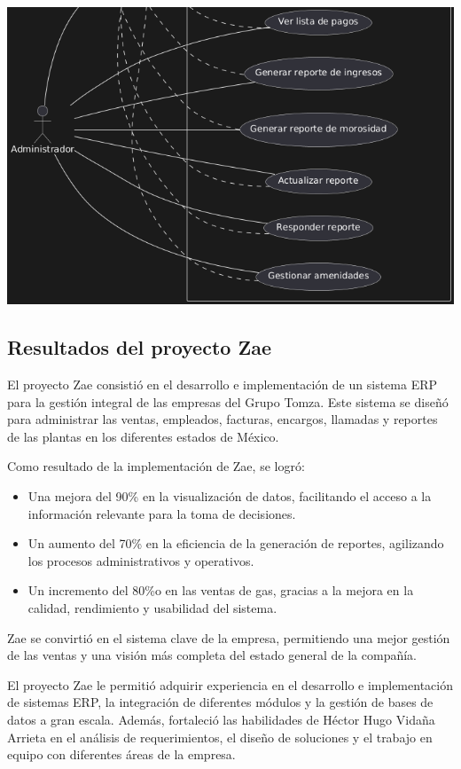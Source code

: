 \documentclass[protocolo.tex]{subfiles}
\begin{document}
\includegraphics[scale=0.8]{Imagenes/adminfracpt4.png}


\subsection{Resultados del proyecto Zae}

El proyecto Zae consistió en el desarrollo e implementación de un sistema ERP para la gestión integral de las empresas del Grupo Tomza. Este sistema se diseñó para administrar las ventas, empleados, facturas, encargos, llamadas y reportes de las plantas en los diferentes estados de México.\vspace{4mm}

Como resultado de la implementación de Zae, se logró:

\begin{itemize}
\item Una mejora del 90\% en la visualización de datos,  facilitando el acceso a la información relevante para la toma de decisiones.
\item Un aumento del 70\% en la eficiencia de la generación de reportes,  agilizando los procesos administrativos y operativos.
\item Un incremento del 80\%o en las ventas de gas,  gracias a la mejora en la calidad, rendimiento y usabilidad del sistema.
\end{itemize}

Zae se convirtió en el sistema clave de la empresa,  permitiendo una mejor gestión de las ventas y una visión más completa del estado general de la compañía.\vspace{4mm}

El proyecto Zae le permitió adquirir experiencia en el desarrollo e implementación de sistemas ERP,  la integración de diferentes módulos y la gestión de bases de datos a gran escala.  Además,  fortaleció las  habilidades de Héctor Hugo Vidaña Arrieta en el análisis de requerimientos,  el diseño de soluciones  y  el  trabajo  en  equipo  con  diferentes  áreas  de  la  empresa.\vspace{4mm}
\end{document}
